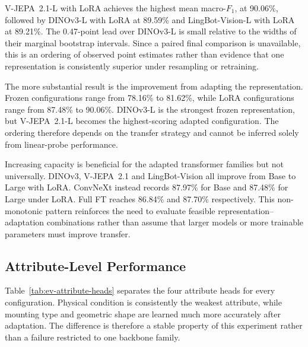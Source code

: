 V-JEPA~2.1-L with \gls{LoRA} achieves the highest mean macro-\(F_1\), at 90.06\%, followed by DINOv3-L with \gls{LoRA} at 89.59\% and LingBot-Vision-L with \gls{LoRA} at 89.21\%. The 0.47-point lead over DINOv3-L is small relative to the widths of their marginal bootstrap intervals. Since a paired final comparison is unavailable, this is an ordering of observed point estimates rather than evidence that one representation is consistently superior under resampling or retraining.

The more substantial result is the improvement from adapting the representation. Frozen configurations range from 78.16\% to 81.62\%, while \gls{LoRA} configurations range from 87.48\% to 90.06\%. DINOv3-L is the strongest frozen representation, but V-JEPA~2.1-L becomes the highest-scoring adapted configuration. The ordering therefore depends on the transfer strategy and cannot be inferred solely from linear-probe performance.

Increasing capacity is beneficial for the adapted transformer families but not universally. DINOv3, V-JEPA~2.1 and LingBot-Vision all improve from Base to Large with \gls{LoRA}. ConvNeXt instead records 87.97\% for Base and 87.48\% for Large under \gls{LoRA}. Full \gls{FT} reaches 86.84\% and 87.70\% respectively. This non-monotonic pattern reinforces the need to evaluate feasible representation--adaptation combinations rather than assume that larger models or more trainable parameters must improve transfer.

\subsection{Attribute-Level Performance}
\label{sec:ev-attribute-heads}
Table~\ref{tab:ev-attribute-heads} separates the four attribute heads for every configuration. Physical condition is consistently the weakest attribute, while mounting type and geometric shape are learned much more accurately after adaptation. The difference is therefore a stable property of this experiment rather than a failure restricted to one backbone family.

